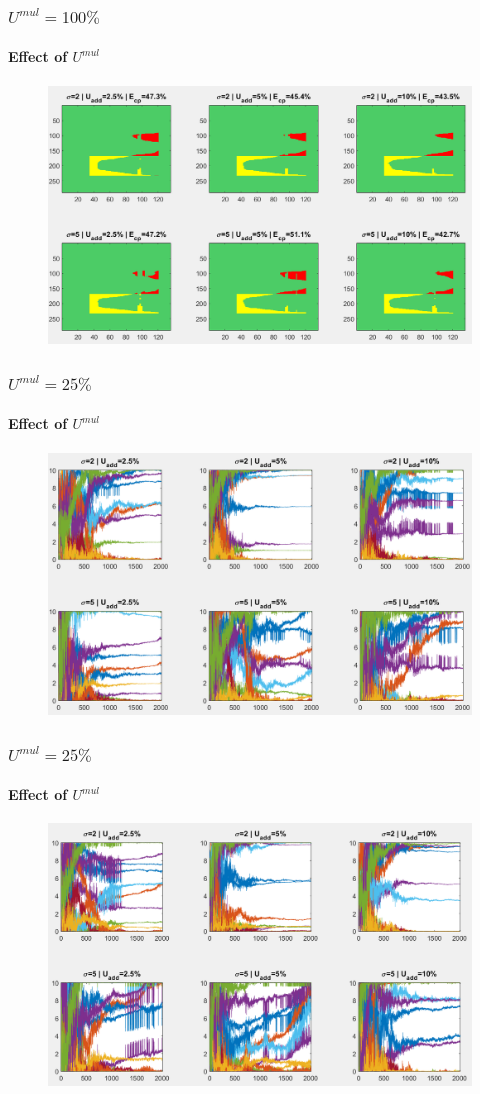 \documentclass[fleqn]{beamer}
\begin{document}
\begin{frame}
	\frametitle{$U^{mul}=100\% $}
	\framesubtitle{Effect of $U^{mul}$}
	\begin{figure}
		\centering
		\includegraphics[width=4.5in]{figures/results_figures/Umul/cp_Umul_100_lambda_11.png}
	\end{figure}
\end{frame}


\begin{frame}
	\frametitle{$U^{mul}=25\% $}
	\framesubtitle{Effect of $U^{mul}$}
	\begin{figure}
		\centering
		\includegraphics[width=4.5in]{figures/results_figures/Umul/knobs_Umul_25_lambda_11.png}
	\end{figure}
\end{frame}

\begin{frame}
	\frametitle{$U^{mul}=25\%$}
	\framesubtitle{Effect of $U^{mul}$}
	\begin{figure}
		\centering
		\includegraphics[width=4.5in]{figures/results_figures/Umul/knobs_Umul_50_lambda_11.png}
	\end{figure}
\end{frame}
\end{document}
